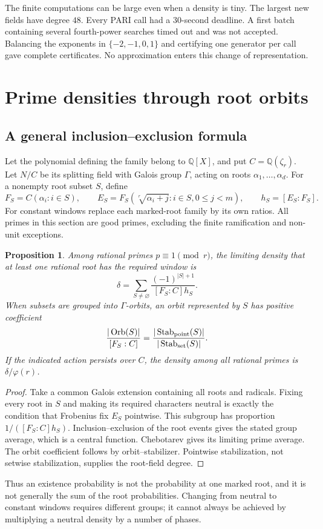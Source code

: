 \documentclass[11pt]{article}
\newtheorem{proposition}[theorem]{Proposition}
\theoremstyle{definition}\newtheorem{definition}[theorem]{Definition}
\newcommand{\Q}{\mathbb Q}
\newcommand{\Stab}{\operatorname{Stab}}
\begin{document}
The finite computations can be large even when a density is tiny.
The largest new fields have degree $48$. Every PARI call had a
$30$-second deadline. A first batch containing several fourth-power
searches timed out and was not accepted. Balancing the exponents in
$\{-2,-1,0,1\}$ and certifying one generator per call gave complete
certificates. No approximation enters this change of representation.

\section{Prime densities through root orbits}\label{sec:orbits}
\subsection{A general inclusion--exclusion formula}
Let the polynomial defining the family belong to $\Q[X]$, and put
$C=\Q(\zeta_r)$. Let $N/C$ be its splitting field with Galois group
$\Gamma$, acting on roots $\alpha_1,\ldots,\alpha_d$. For a nonempty
root subset $S$, define
\[
 F_S=C(\alpha_i:i\in S),\qquad
 E_S=F_S(\sqrt[r]{\alpha_i+j}:i\in S,0\le j<m),
 \qquad h_S=[E_S:F_S].
\]
For constant windows replace each marked-root family by its own ratios.
All primes in this section are good primes, excluding the finite
ramification and non-unit exceptions.
\begin{proposition}\label{prop:orbit}
Among rational primes $p\equiv1\pmod r$, the limiting density that
at least one rational root has the required window is
\begin{equation}\label{eq:orbit}
 \delta=\sum_{S\ne\varnothing}
       \frac{(-1)^{|S|+1}}{[F_S:C]h_S}.
\end{equation}
When subsets are grouped into $\Gamma$-orbits, an orbit represented
by $S$ has positive coefficient
\[
 \frac{|\operatorname{Orb}(S)|}{[F_S:C]}
 =\frac{|\Stab_{\rm point}(S)|}{|\Stab_{\rm set}(S)|}.
\]
If the indicated action persists over $C$, the density among all
rational primes is $\delta/\varphi(r)$.
\end{proposition}
\begin{proof}
Take a common Galois extension containing all roots and radicals.
Fixing every root in $S$ and making its required characters neutral
is exactly the condition that Frobenius fix $E_S$ pointwise. This
subgroup has proportion $1/([F_S:C]h_S)$. Inclusion--exclusion of
the root events gives the stated group average, which is a central
function. Chebotarev gives its limiting prime average. The orbit
coefficient follows by orbit--stabilizer. Pointwise stabilization,
not setwise stabilization, supplies the root-field degree.
\end{proof}
Thus an existence probability is not the probability at one marked
root, and it is not generally the sum of the root probabilities.
Changing from neutral to constant windows requires different groups;
it cannot always be achieved by multiplying a neutral density by a
number of phases.
\end{document}
